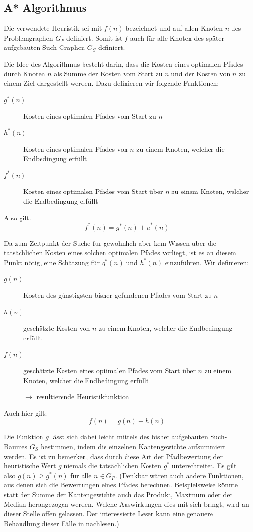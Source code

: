 \subsection{A* Algorithmus}

Die verwendete Heuristik sei mit $f(n)$ bezeichnet und auf allen Knoten $n$ des Problemgraphen $G_{P}$ definiert. Somit ist $f$ auch für alle Knoten des später aufgebauten Such-Graphen $G_{S}$ definiert.

Die Idee des Algorithmus besteht darin, dass die Kosten eines optimalen Pfades durch Knoten $n$ als Summe der Kosten vom Start zu $n$ und der Kosten von $n$ zu einem Ziel dargestellt werden.
Dazu definieren wir folgende Funktionen:

\begin{description}
	\item[$g^{*}(n)$]{Kosten eines optimalen Pfades vom Start zu $n$}
	\item[$h^{*}(n)$]{Kosten eines optimalen Pfades von $n$ zu einem Knoten, welcher die Endbedingung erfüllt}
	\item[$f^{*}(n)$]{Kosten eines optimalen Pfades vom Start über $n$ zu einem Knoten, welcher die Endbedingung erfüllt}
\end{description}
Also gilt: \[f^{*}(n)=g^{*}(n)+h^{*}(n)\]


Da zum Zeitpunkt der Suche für gewöhnlich aber kein Wissen über die tatsächlichen Kosten eines solchen optimalen Pfades vorliegt, ist es an diesem Punkt nötig, eine Schätzung für $g^{*}(n)$ und $h^{*}(n)$ einzuführen.
Wir definieren:

\begin{description}
	\item[$g(n)$]{Kosten des günstigsten bisher gefundenen Pfades vom Start zu $n$}
	\item[$ h(n)$]{geschätzte Kosten von $n$ zu einem Knoten, welcher die Endbedingung erfüllt}
	\item[$ f(n)$]{geschätzte Kosten eines optimalen Pfades vom Start über $n$ zu einem Knoten, welcher die Endbedingung erfüllt

		$\rightarrow$ resultierende Heuristikfunktion}
\end{description}
Auch hier gilt: \[f(n)=g(n)+h(n)\]

Die Funktion $g$ lässt sich dabei leicht mittels des bisher aufgebauten Such-Baumes $G_{S}$ bestimmen, indem die einzelnen Kantengewichte aufsummiert werden.
Es ist zu bemerken, dass durch diese Art der Pfadbewertung der heuristische Wert $g$ niemals die tatsächlichen Kosten $g^{*}$ unterschreitet.
Es gilt also $g(n) \geq g^{*}(n)$ für alle $n \in G_{P}$.
(Denkbar wären auch andere Funktionen, aus denen sich die Bewertungen eines Pfades berechnen. Beispielsweise könnte statt der Summe der Kantengewichte auch das Produkt, Maximum oder der Median herangezogen werden. Welche Auswirkungen dies mit sich bringt, wird an dieser Stelle offen gelassen. Der interessierte Leser kann eine genauere Behandlung dieser Fälle in \cite{Dechter:1985:GBS:3828.3830} nachlesen.)

